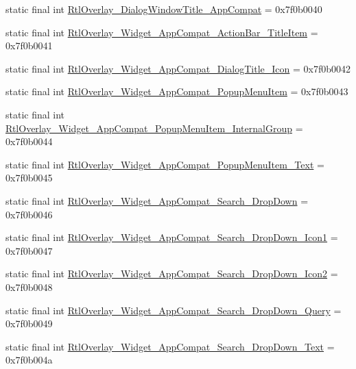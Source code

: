 \begin{CompactItemize}
\item 
static final int \hyperlink{classandroid_1_1support_1_1graphics_1_1drawable_1_1_r_1_1style_ed5f6020b5fa22f188ab84414366199d}{RtlOverlay\_\-DialogWindowTitle\_\-AppCompat} = 0x7f0b0040
\item 
static final int \hyperlink{classandroid_1_1support_1_1graphics_1_1drawable_1_1_r_1_1style_4a1d4f5f4366e49087ebfb0fe6cbbe4e}{RtlOverlay\_\-Widget\_\-AppCompat\_\-ActionBar\_\-TitleItem} = 0x7f0b0041
\item 
static final int \hyperlink{classandroid_1_1support_1_1graphics_1_1drawable_1_1_r_1_1style_c6657a7097580c7190928db2ce7da2f9}{RtlOverlay\_\-Widget\_\-AppCompat\_\-DialogTitle\_\-Icon} = 0x7f0b0042
\item 
static final int \hyperlink{classandroid_1_1support_1_1graphics_1_1drawable_1_1_r_1_1style_ed973f2918e571aa351cd25d0d55d595}{RtlOverlay\_\-Widget\_\-AppCompat\_\-PopupMenuItem} = 0x7f0b0043
\item 
static final int \hyperlink{classandroid_1_1support_1_1graphics_1_1drawable_1_1_r_1_1style_8c472a1eb8bb3517ae4cadc824c74edd}{RtlOverlay\_\-Widget\_\-AppCompat\_\-PopupMenuItem\_\-InternalGroup} = 0x7f0b0044
\item 
static final int \hyperlink{classandroid_1_1support_1_1graphics_1_1drawable_1_1_r_1_1style_da113851b4a753efa39442d656616106}{RtlOverlay\_\-Widget\_\-AppCompat\_\-PopupMenuItem\_\-Text} = 0x7f0b0045
\item 
static final int \hyperlink{classandroid_1_1support_1_1graphics_1_1drawable_1_1_r_1_1style_bdfb3144b3158dd5508c6d19facee8ee}{RtlOverlay\_\-Widget\_\-AppCompat\_\-Search\_\-DropDown} = 0x7f0b0046
\item 
static final int \hyperlink{classandroid_1_1support_1_1graphics_1_1drawable_1_1_r_1_1style_887dbfd69b80080e42d6cdc7cae6b285}{RtlOverlay\_\-Widget\_\-AppCompat\_\-Search\_\-DropDown\_\-Icon1} = 0x7f0b0047
\item 
static final int \hyperlink{classandroid_1_1support_1_1graphics_1_1drawable_1_1_r_1_1style_0404657db130365f06c0ceb906ceca54}{RtlOverlay\_\-Widget\_\-AppCompat\_\-Search\_\-DropDown\_\-Icon2} = 0x7f0b0048
\item 
static final int \hyperlink{classandroid_1_1support_1_1graphics_1_1drawable_1_1_r_1_1style_a47f10fc5db822b8e7327eb0a1242628}{RtlOverlay\_\-Widget\_\-AppCompat\_\-Search\_\-DropDown\_\-Query} = 0x7f0b0049
\item 
static final int \hyperlink{classandroid_1_1support_1_1graphics_1_1drawable_1_1_r_1_1style_d60307d8c95b7ad7517956203966f3aa}{RtlOverlay\_\-Widget\_\-AppCompat\_\-Search\_\-DropDown\_\-Text} = 0x7f0b004a

\end{CompactItemize}
